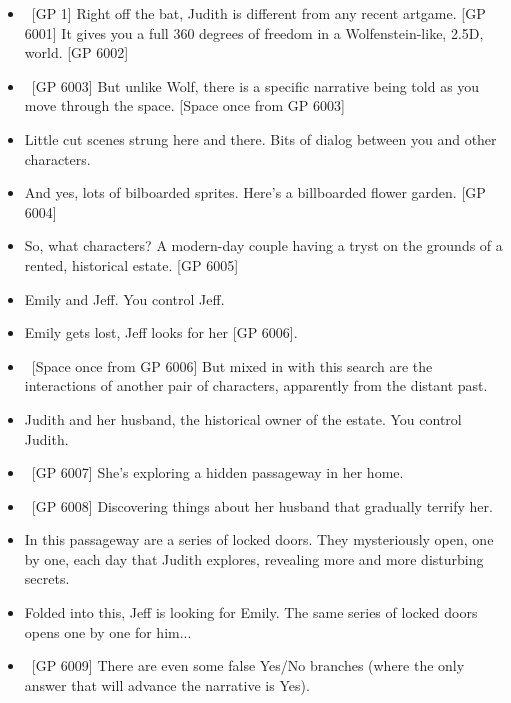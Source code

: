 \documentclass[12pt]{article}
\begin{document}
{\Huge

\begin{itemize}

\item \ [GP 1] Right off the bat, Judith is different from any recent artgame. [GP 6001] It gives you a full 360 degrees of freedom in a Wolfenstein-like, 2.5D, world.  [GP 6002]

\item \ [GP 6003] But unlike Wolf, there is a specific narrative being told as you move through the space. [Space once from GP 6003]

\item Little cut scenes strung here and there. Bits of dialog between you and other characters.
  
\item And yes, lots of bilboarded sprites.  Here's a billboarded flower garden. [GP 6004]

\item So, what characters?  A modern-day couple having a tryst on the grounds of a rented, historical estate. [GP 6005]

\item Emily and Jeff.  You control Jeff.

\item Emily gets lost, Jeff looks for her [GP 6006].

\item \ [Space once from GP 6006] But mixed in with this search are the interactions of another pair of characters, apparently from the distant past.

\item Judith and her husband, the historical owner of the estate.  You control Judith.

\item \ [GP 6007] She's exploring a hidden passageway in her home.  


\item \ [GP 6008] Discovering things about her husband that gradually terrify her.

\item In this passageway are a series of locked doors.  They mysteriously open, one by one, each day that Judith explores, revealing more and more disturbing secrets.

\item Folded into this, Jeff is looking for Emily.  The same series of locked doors opens one by one for him...


\item \ [GP 6009] There are even some false Yes/No branches (where the only answer that will advance the narrative is Yes).



\end{itemize}}
\end{document}
